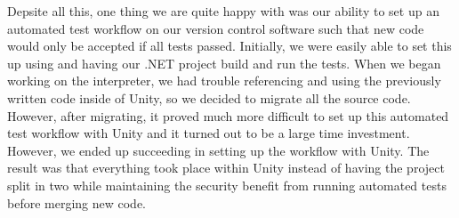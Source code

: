 Depsite all this, one thing we are quite happy with was our ability to set up an automated test workflow on our version control software such that new code would only be accepted if all tests passed.
Initially, we were easily able to set this up using and having our .NET project build and run the tests.
When we began working on the interpreter, we had trouble referencing and using the previously written code inside of Unity, so we decided to migrate all the source code.
However, after migrating, it proved much more difficult to set up this automated test workflow with Unity and it turned out to be a large time investment.
However, we ended up succeeding in setting up the workflow with Unity.
The result was that everything took place within Unity instead of having the project split in two while maintaining the security benefit from running automated tests before merging new code.